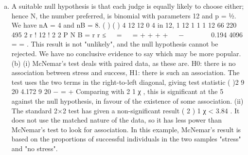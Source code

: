 \documentclass[a4paper,12pt]{article}
\begin{document}
\begin{enumerate}[(a)]
\item  A suitable null hypothesis is that each judge is equally likely to choose either;
hence N, the number preferred, is binomial with parameters 12 and p = ½. We have
nA = 4 and nB = 8.
( ) ( ) { }
4 12
12
0
4 in 12, 1 12 1 1 1 12 66 220 495
2 r ! 12 ! 2 2
P N B
= r r
≤   =   = + + + +   −        0.194
4096
= = .
This result is not "unlikely", and the null hypothesis cannot be rejected. We have no
conclusive evidence to say which may be more popular.
(b) (i) McNemar's test deals with paired data, as these are.
H0: there is no association between stress and success,
H1: there is such an association.
The test uses the two terms in the right-to-left diagonal, giving test statistic
( )2 9 20
4.172
9 20
−
=
+
Comparing with 2
1 χ , this is significant at the 5%
against the null hypothesis, in favour of the existence of some association.
(ii) The standard 2×2 test has given a non-significant result ( 2 )
1 χ < 3.84 . It
does not use the matched nature of the data, so it has less power than
McNemar's test to look for association. In this example, McNemar's result is
based on the proportions of successful individuals in the two samples "stress"
and "no stress".

\end{enumerate}
\end{document}
